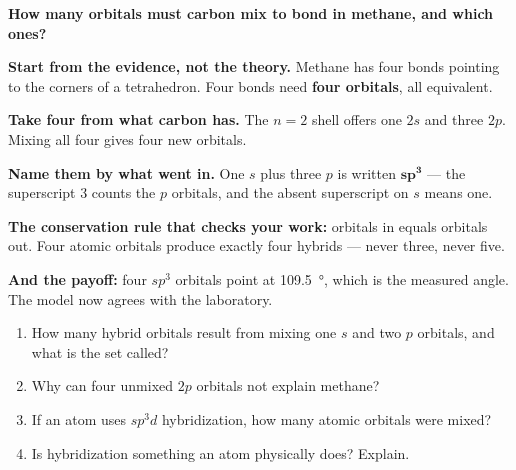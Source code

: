 \documentclass{apchem-worksheet}
\begin{document}
\begin{workedexample}
\textbf{How many orbitals must carbon mix to bond in methane, and which
ones?}

\textbf{Start from the evidence, not the theory.} Methane has four bonds
pointing to the corners of a tetrahedron. Four bonds need
\textbf{four orbitals}, all equivalent.

\textbf{Take four from what carbon has.} The $n = 2$ shell offers one
$2s$ and three $2p$. Mixing all four gives four new orbitals.

\textbf{Name them by what went in.} One $s$ plus three $p$ is written
$\mathbf{sp^{3}}$ --- the superscript 3 counts the $p$ orbitals, and the
absent superscript on $s$ means one.

\textbf{The conservation rule that checks your work:} orbitals in equals
orbitals out. Four atomic orbitals produce exactly four hybrids ---
never three, never five.

\textbf{And the payoff:} four $sp^{3}$ orbitals point at
\SI{109.5}{\degree}, which is the measured  angle. The model
now agrees with the laboratory.
\end{workedexample}

\begin{yourturn}
\begin{enumerate}[leftmargin=*,itemsep=0.5em]
  \item How many hybrid orbitals result from mixing one $s$ and two $p$
        orbitals, and what is the set called? \workspace[1.4cm]
  \item Why can four unmixed $2p$ orbitals not explain methane?
        \workspace[1.6cm]
  \item If an atom uses $sp^{3}d$ hybridization, how many atomic orbitals
        were mixed? \workspace[1.4cm]
  \item Is hybridization something an atom physically does? Explain.
        \workspace[1.6cm]
\end{enumerate}
\end{yourturn}
\end{document}
